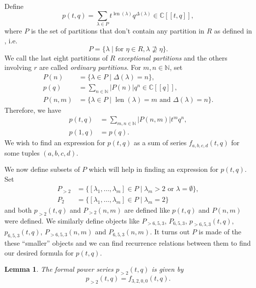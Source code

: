 \documentclass[a4paper, 12pt, reqno]{amsart}
\newtheorem{lemma}[theorem]{Lemma}
\theoremstyle{remark}
\numberwithin{equation}{subsection}
\DeclareMathOperator{\len}{len}
\begin{document}
Define
\begin{equation*}
  p(t, q) = \sum_{\lambda \in P}t^{\len(\lambda)}q^{\Delta(\lambda)} \in \mathbb{C}[[t, q]],
\end{equation*}
where $P$ is the set of partitions that don't contain any partition in $R$ as defined in , i.e.
\begin{equation*}
  P = \{\lambda \mid \text{for }\eta \in R, \lambda \nsupseteq \eta\}.
\end{equation*}
We call the last eight partitions of $R$ \emph{exceptional partitions} and the others involving $r$ are called \emph{ordinary partitions}.
For $m, n \in \mathbb{N}$, set
\begin{align*}
  P(n) &= \{\lambda \in P \mid \Delta(\lambda) = n\}, \\
  p(q) &= \sum_{n \in \mathbb{N}}|P(n)|q^n \in \mathbb{C}[[q]], \\
  P(n, m) &= \{\lambda \in P \mid \len(\lambda) = m\text{ and }\Delta(\lambda) = n\}.
\end{align*}
Therefore, we have
\begin{align*}
  p(t, q) &= \sum_{m, n \in \mathbb{N}}|P(n, m)|t^mq^n, \\
  p(1, q) &= p(q).
\end{align*}
We wish to find an expression for $p(t, q)$ as a sum of series $f_{a, b, c, d}(t, q)$ for some tuples $(a, b, c, d)$.

We now define subsets of $P$ which will help in finding an expression for $p(t, q)$.
Set
\begin{align*}
  P_{>2} &= \{[\lambda_1, \dots, \lambda_m] \in P \mid \lambda_m > 2\text{ or }\lambda = \emptyset\}, \\
  P_2 &= \{[\lambda_1, \dots, \lambda_m] \in P \mid \lambda_m = 2\}
\end{align*}
and both $p_{>2}(t, q)$ and $P_{>2}(n, m)$ are defined like $p(t, q)$ and $P(n, m)$ were defined.
We similarly define objects like $P_{>6, 5, 3}$, $P_{6, 5, 3}$, $p_{>6, 5, 3}(t, q)$, $p_{6, 5, 3}(t, q)$, $P_{>6, 5, 3}(n, m)$ and $P_{6, 5, 3}(n, m)$.
It turns out $P$ is made of the these ``smaller'' objects and we can find recurrence relations between them to find our desired formula for $p(t, q)$.

\begin{lemma}
  \label{lmm:21}
  The formal power series $p_{>2}(t, q)$ is given by
  \begin{equation*}
    p_{>2}(t, q) = f_{3, 2, 0, 0}(t, q).
  \end{equation*}
\end{lemma}
\end{document}
